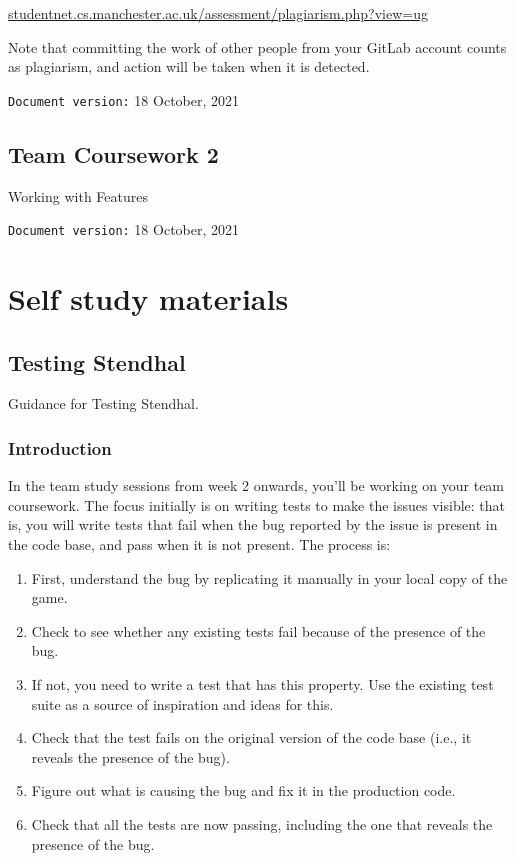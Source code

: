 \documentclass[
]{book}
\providecommand{\tightlist}{%
  \setlength{\itemsep}{0pt}\setlength{\parskip}{0pt}}
\begin{document}
\href{http://studentnet.cs.manchester.ac.uk/assessment/plagiarism.php?view=ug}{studentnet.cs.manchester.ac.uk/assessment/plagiarism.php?view=ug}

Note that committing the work of other people from your GitLab account counts as plagiarism, and action will be taken when it is detected.

\texttt{Document\ version:} 18 October, 2021

\hypertarget{working}{%
\chapter{Team Coursework 2}\label{working}}

Working with Features

\texttt{Document\ version:} 18 October, 2021

\hypertarget{part-self-study-materials}{%
\part{Self study materials}\label{part-self-study-materials}}

\hypertarget{guiding}{%
\chapter{Testing Stendhal}\label{guiding}}

Guidance for Testing Stendhal.

\hypertarget{intros}{%
\section{Introduction}\label{intros}}

In the team study sessions from week 2 onwards, you'll be working on your team coursework. The focus initially is on writing tests to make the issues visible: that is, you will write tests that fail when the bug reported by the issue is present in the code base, and pass when it is not present. The process is:

\begin{enumerate}
\def\labelenumi{\arabic{enumi}.}
\tightlist
\item
  First, understand the bug by replicating it manually in your local copy of the game.
\item
  Check to see whether any existing tests fail because of the presence of the bug.
\item
  If not, you need to write a test that has this property. Use the existing test suite as a source of inspiration and ideas for this.
\item
  Check that the test fails on the original version of the code base (i.e., it reveals the presence of the bug).
\item
  Figure out what is causing the bug and fix it in the production code.
\item
  Check that all the tests are now passing, including the one that reveals the presence of the bug.
\end{enumerate}
\end{document}
